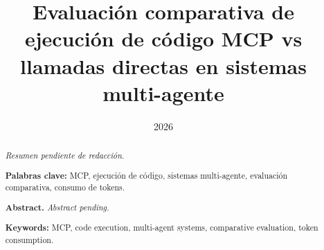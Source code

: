 \documentclass[12pt,letterpaper]{article}
\title{
  \vspace{-2cm}
  \textbf{Evaluación comparativa de ejecución de código MCP vs llamadas directas en sistemas multi-agente}
  \vspace{1cm}
}
\author{
}
\date{2026}
\begin{document}
\maketitle
\thispagestyle{empty}
\newpage

\begin{abstract}
\noindent
\textit{Resumen pendiente de redacción.}

\vspace{1em}
\noindent\textbf{Palabras clave:} MCP, ejecución de código, sistemas multi-agente, evaluación comparativa, consumo de tokens.

\vspace{2em}
\noindent\textbf{Abstract.}
\textit{Abstract pending.}

\vspace{1em}
\noindent\textbf{Keywords:} MCP, code execution, multi-agent systems, comparative evaluation, token consumption.
\end{abstract}
\newpage

\tableofcontents
\newpage


\newpage


\newpage


\newpage


\newpage


\newpage


\newpage


\newpage


\newpage


\newpage



\newpage

\appendix

\end{document}
